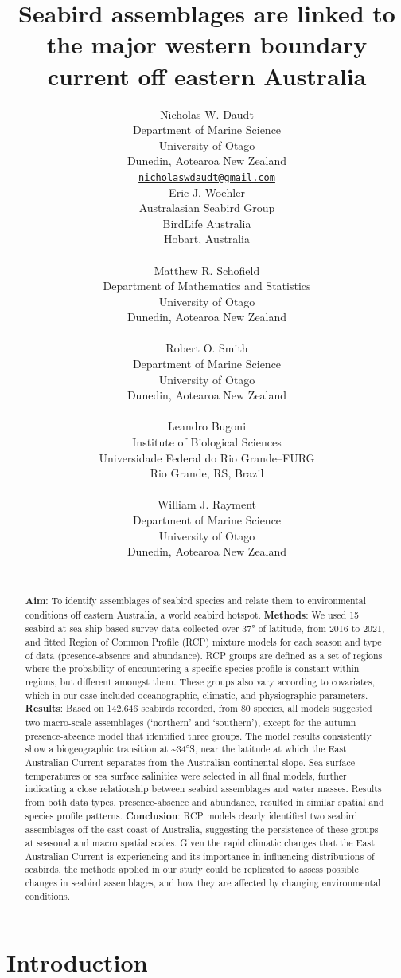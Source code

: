 \documentclass{article}
\title{Seabird assemblages are linked to the major western boundary
current off eastern Australia}
\author{
    Nicholas W. Daudt
   \\
    Department of Marine Science \\
    University of Otago \\
  Dunedin, Aotearoa New Zealand \\
  \texttt{\href{mailto:nicholaswdaudt@gmail.com}{\nolinkurl{nicholaswdaudt@gmail.com}}} \\
   \And
    Eric J. Woehler
   \\
    Australasian Seabird Group \\
    BirdLife Australia \\
  Hobart, Australia \\
  \texttt{} \\
   \And
    Matthew R. Schofield
   \\
    Department of Mathematics and Statistics \\
    University of Otago \\
  Dunedin, Aotearoa New Zealand \\
  \texttt{} \\
   \And
    Robert O. Smith
   \\
    Department of Marine Science \\
    University of Otago \\
  Dunedin, Aotearoa New Zealand \\
  \texttt{} \\
   \And
    Leandro Bugoni
   \\
    Institute of Biological Sciences \\
    Universidade Federal do Rio Grande--FURG \\
  Rio Grande, RS, Brazil \\
  \texttt{} \\
   \And
    William J. Rayment
   \\
    Department of Marine Science \\
    University of Otago \\
  Dunedin, Aotearoa New Zealand \\
  \texttt{} \\
  }
\begin{document}
\maketitle


\begin{abstract}
\textbf{Aim}: To identify assemblages of seabird species and relate them
to environmental conditions off eastern Australia, a world seabird
hotspot. \textbf{Methods}: We used 15 seabird at-sea ship-based survey
data collected over 37° of latitude, from 2016 to 2021, and fitted
Region of Common Profile (RCP) mixture models for each season and type
of data (presence-absence and abundance). RCP groups are defined as a
set of regions where the probability of encountering a specific species
profile is constant within regions, but different amongst them. These
groups also vary according to covariates, which in our case included
oceanographic, climatic, and physiographic parameters. \textbf{Results}:
Based on 142,646 seabirds recorded, from 80 species, all models
suggested two macro-scale assemblages (`northern' and `southern'),
except for the autumn presence-absence model that identified three
groups. The model results consistently show a biogeographic transition
at \textasciitilde34°S, near the latitude at which the East Australian
Current separates from the Australian continental slope. Sea surface
temperatures or sea surface salinities were selected in all final
models, further indicating a close relationship between seabird
assemblages and water masses. Results from both data types,
presence-absence and abundance, resulted in similar spatial and species
profile patterns. \textbf{Conclusion}: RCP models clearly identified two
seabird assemblages off the east coast of Australia, suggesting the
persistence of these groups at seasonal and macro spatial scales. Given
the rapid climatic changes that the East Australian Current is
experiencing and its importance in influencing distributions of
seabirds, the methods applied in our study could be replicated to assess
possible changes in seabird assemblages, and how they are affected by
changing environmental conditions.
\end{abstract}


\hypertarget{introduction}{%
\section{Introduction}\label{introduction}}
\end{document}
